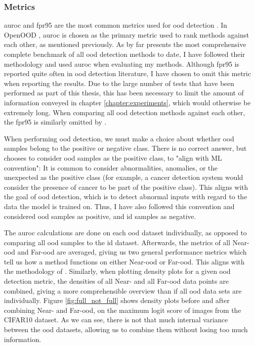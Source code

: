 \documentclass[UKenglish]{uiomasterthesis} %
\theoremstyle{definition}
\begin{document}
\subsubsection{Metrics}

\ac{auroc} and \ac{fpr95} are the most common metrics used for \ac{ood} detection \cite{oodbaseline, odin, oodoverview, openood, vim}. In OpenOOD \cite{openood, openood15}, \ac{auroc} is chosen as the primary metric used to rank methods against each other, as mentioned previously. As \cite{openood} by far presents the most comprehensive complete benchmark of all \ac{ood} detection methods to date, I have followed their methodology and used \ac{auroc} when evaluating my methods. Although \ac{fpr95} is reported quite often in \ac{ood} detection literature, I have chosen to omit this metric when reporting the results. Due to the large number of tests that have been performed as part of this thesis, this has been necessary to limit the amount of information conveyed in chapter \ref{chapter:experiments}, which would otherwise be extremely long. When comparing all \ac{ood} detection methods against each other, the \ac{fpr95} is similarly omitted by \cite{openood15}. %

When performing \ac{ood} detection, we must make a choice about whether \ac{ood} samples belong to the positive or negative class. There is no correct answer, but \cite{openood} chooses to consider \ac{ood} samples as the positive class, to "align with ML convention": It is common to consider abnormalities, anomalies, or the unexpected as the positive class (for example, a cancer detection system would consider the presence of cancer to be part of the positive class). This aligns with the goal of \ac{ood} detection, which is to detect abnormal inputs with regard to the data the model is trained on. Thus, I have also followed this convention and considered \ac{ood} samples as positive, and \ac{id} samples as negative.

The \ac{auroc} calculations are done on each \ac{ood} dataset individually, as opposed to comparing all \ac{ood} samples to the \ac{id} dataset. Afterwards, the metrics of all Near-\ac{ood} and Far-\ac{ood} are averaged, giving us two general performance metrics which tell us how a method functions on either Near-\ac{ood} or Far-\ac{ood}. This aligns with the methodology of \cite{openood, openood15}. Similarly, when plotting density plots for a given \ac{ood} detection metric, the densities of all Near- and all Far-\ac{ood} data points are combined, giving a more comprehensible overview than if all \ac{ood} data sets are individually. Figure \ref{fig:full_not_full} shows density plots before and after combining Near- and Far-\ac{ood}, on the maximum logit score of images from the CIFAR10 dataset. As we can see, there is not that much internal variance between the \ac{ood} datasets, allowing us to combine them without losing too much information.
\end{document}
